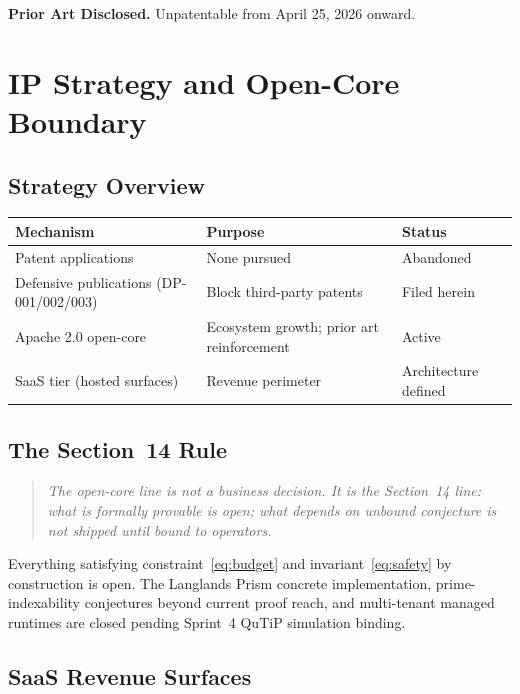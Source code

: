 \documentclass[12pt,letterpaper]{article}
\begin{document}
\textbf{Prior Art Disclosed.} Unpatentable from April 25, 2026 onward.

\section{IP Strategy and Open-Core Boundary}

\subsection{Strategy Overview}

\begin{center}
\begin{tabular}{lll}
  \toprule
  \textbf{Mechanism} & \textbf{Purpose} & \textbf{Status} \\
  \midrule
  Patent applications & None pursued & Abandoned \\
  Defensive publications (DP-001/002/003) & Block third-party patents & Filed herein \\
  Apache 2.0 open-core & Ecosystem growth; prior art reinforcement & Active \\
  SaaS tier (hosted surfaces) & Revenue perimeter & Architecture defined \\
  \bottomrule
\end{tabular}
\end{center}

\subsection{The Section~14 Rule}

\begin{quote}
  \itshape The open-core line is not a business decision.
  It is the Section~14 line: what is formally provable is open;
  what depends on unbound conjecture is not shipped until bound to
  operators.
\end{quote}

Everything satisfying constraint~\eqref{eq:budget} and
invariant~\eqref{eq:safety} by construction is open. The Langlands
Prism concrete implementation, prime-indexability conjectures beyond
current proof reach, and multi-tenant managed runtimes are closed
pending Sprint~4 QuTiP simulation binding.

\subsection{SaaS Revenue Surfaces}
\end{document}
